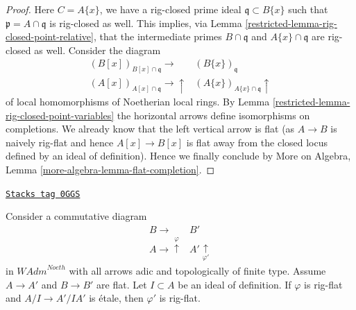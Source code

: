\begin{proof}
\medskip\noindent
Here $C = A\{x\}$, we have a rig-closed prime ideal
$\mathfrak q \subset B\{x\}$ such that
$\mathfrak p = A \cap \mathfrak q$ is rig-closed as well.
This implies, via Lemma \ref{restricted-lemma-rig-closed-point-relative},
that the intermediate primes $B \cap \mathfrak q$ and
$A\{x\} \cap \mathfrak q$ are rig-closed as well.
Consider the diagram
$$
\begin{array}{cc}(B[x])_{B[x] \cap \mathfrak q} \longrightarrow & (B\{x\})_{\mathfrak q} \\ (A[x])_{A[x] \cap \mathfrak q} \longrightarrow\uparrow & (A\{x\})_{A\{x\} \cap \mathfrak q} \uparrow\end{array}
$$
of local homomorphisms of Noetherian local rings.
By Lemma \ref{restricted-lemma-rig-closed-point-variables}
the horizontal arrows define isomorphisms
on completions. We already know that the left
vertical arrow is flat (as $A \to B$ is naively rig-flat
and hence $A[x] \to B[x]$ is flat away from the
closed locus defined by an ideal of definition).
Hence we finally conclude by
More on Algebra, Lemma \ref{more-algebra-lemma-flat-completion}.
\end{proof}

\begin{lemma}
\label{restricted-lemma-rig-flat-local-etale}
\href{https://stacks.math.columbia.edu/tag/0GGS}{\texttt{Stacks tag 0GGS}}

Consider a commutative diagram
$$
\begin{array}{cc}B \longrightarrow & B' \\ A \longrightarrow\overset{\varphi}{\uparrow} & A' \underset{\varphi'}{\uparrow}\end{array}
$$
in $\textit{WAdm}^{Noeth}$ with all arrows adic and topologically
of finite type. Assume $A \to A'$ and $B \to B'$ are flat.
Let $I \subset A$ be an ideal of definition.
If $\varphi$ is rig-flat and $A/I \to A'/IA'$
is \'etale, then $\varphi'$ is rig-flat.
\end{lemma}

